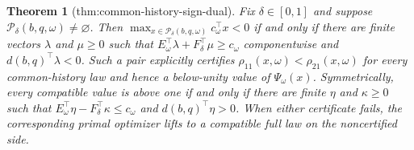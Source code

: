 \documentclass{article}
\newtheorem{theorem}{Theorem}
\begin{document}
\begin{theorem}[thm:common-history-sign-dual]\label{thm:common-history-sign-dual}
Fix \(\delta\in[0,1]\) and suppose \(\mathcal P_\delta(b,q,\omega)\neq\varnothing\). Then \(\max_{x\in\mathcal P_\delta(b,q,\omega)}c_\omega^{\top}x<0\) if and only if there are finite vectors \(\lambda\) and \(\mu\geq0\) such that \(E_\omega^{\top}\lambda+F_\delta^{\top}\mu\geq c_\omega\) componentwise and \(d(b,q)^{\top}\lambda<0\). Such a pair explicitly certifies \(\rho_{11}(x,\omega)<\rho_{21}(x,\omega)\) for every common-history law and hence a below-unity value of \(\Psi_\omega(x)\). Symmetrically, every compatible value is above one if and only if there are finite \(\eta\) and \(\kappa\geq0\) such that \(E_\omega^{\top}\eta-F_\delta^{\top}\kappa\leq c_\omega\) and \(d(b,q)^{\top}\eta>0\). When either certificate fails, the corresponding primal optimizer lifts to a compatible full law on the noncertified side.
\end{theorem}
\end{document}
